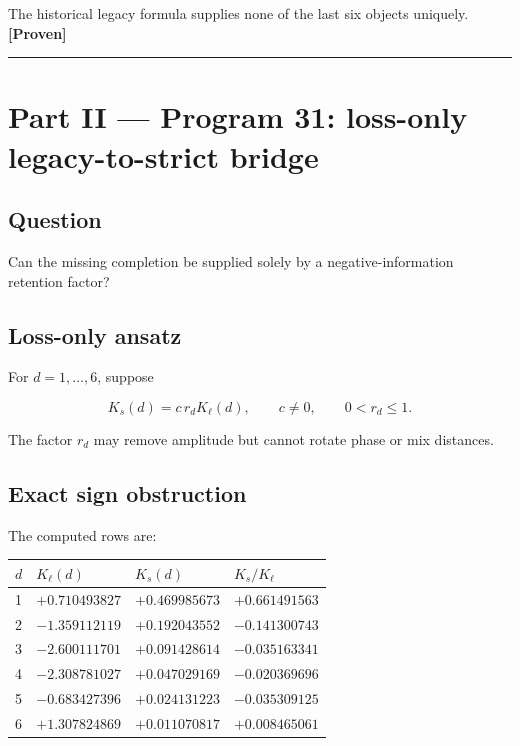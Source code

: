 \documentclass[11pt,a4paper,openany]{report}
\newcommand{\statusProven}{\textcolor{fingreen}{[Proven]}}
\begin{document}
The historical legacy formula supplies none of the last six objects uniquely. \textbf{\statusProven{}}

\par\medskip\hrule\medskip

\chapter{Part II — Program 31: loss-only legacy-to-strict bridge}

\section{Question}

Can the missing completion be supplied solely by a negative-information retention factor?

\section{Loss-only ansatz}

For \(d=1,\ldots,6\), suppose

\[
K_s(d)=c\,r_dK_\ell(d),
\qquad c\ne0,
\qquad 0<r_d\le1.
\]

The factor \(r_d\) may remove amplitude but cannot rotate phase or mix distances.

\section{Exact sign obstruction}

The computed rows are:

\begin{center}
\begingroup\small
\setlength{\tabcolsep}{3.5pt}
\renewcommand{\arraystretch}{1.16}
\begin{longtable}{@{}p{}p{}p{}p{}@{}}
\toprule
\textbf{\(d\)} & \textbf{\(K_\ell(d)\)} & \textbf{\(K_s(d)\)} & \textbf{\(K_s/K_\ell\)} \\
\midrule
\endhead
1 & \(+0.710493827\) & \(+0.469985673\) & \(+0.661491563\) \\
2 & \(-1.359112119\) & \(+0.192043552\) & \(-0.141300743\) \\
3 & \(-2.600111701\) & \(+0.091428614\) & \(-0.035163341\) \\
4 & \(-2.308781027\) & \(+0.047029169\) & \(-0.020369696\) \\
5 & \(-0.683427396\) & \(+0.024131223\) & \(-0.035309125\) \\
6 & \(+1.307824869\) & \(+0.011070817\) & \(+0.008465061\) \\
\bottomrule
\end{longtable}
\endgroup
\end{center}
\end{document}

